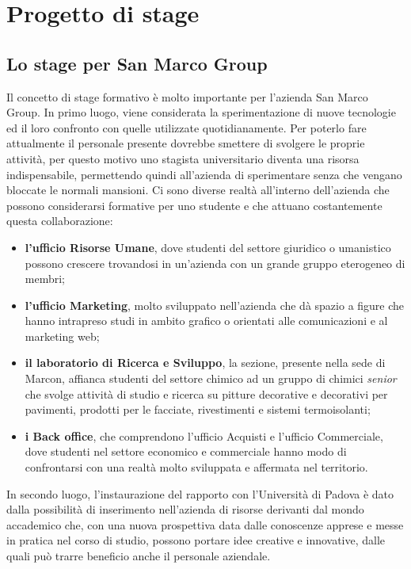 
\chapter{Progetto di stage}
\label{cap:progetto-di-stage}


\section{Lo stage per San Marco Group}

Il concetto di stage formativo è molto importante per l'azienda San Marco Group. 
In primo luogo, viene considerata la sperimentazione di nuove tecnologie ed il loro confronto con quelle utilizzate quotidianamente. Per poterlo fare attualmente il personale presente dovrebbe smettere di svolgere le proprie attività, per questo motivo uno stagista universitario diventa una risorsa indispensabile, permettendo quindi all'azienda di sperimentare senza che vengano bloccate le normali mansioni.
Ci sono diverse realtà all'interno dell'azienda che possono considerarsi formative per uno studente e che attuano costantemente questa collaborazione:
\begin{itemize}
	\item \textbf{l'ufficio Risorse Umane}, dove studenti del settore giuridico o umanistico possono crescere trovandosi in un'azienda con un grande gruppo eterogeneo di membri; 
	\item \textbf{l'ufficio Marketing}, molto sviluppato nell'azienda che dà spazio a figure che hanno intrapreso studi in ambito grafico o orientati alle comunicazioni e al marketing web;
	\item \textbf{il laboratorio di Ricerca e Sviluppo}, la sezione, presente nella sede di Marcon, affianca studenti del settore chimico ad un gruppo di chimici \textit{senior} che svolge attività di studio e ricerca su pitture decorative e decorativi per pavimenti, prodotti per le facciate, rivestimenti e sistemi termoisolanti; 
	\item \textbf{i Back office}, che comprendono l'ufficio Acquisti e l'ufficio Commerciale, dove studenti nel settore economico e commerciale hanno modo di confrontarsi con una realtà molto sviluppata e affermata nel territorio.
\end{itemize}
In secondo luogo, l'instaurazione del rapporto con l'Università di Padova è dato dalla possibilità di inserimento nell'azienda di risorse derivanti dal mondo accademico che, con una nuova prospettiva data dalle conoscenze apprese e messe in pratica nel corso di studio, possono portare idee creative e innovative, dalle quali può trarre beneficio anche il personale aziendale.

